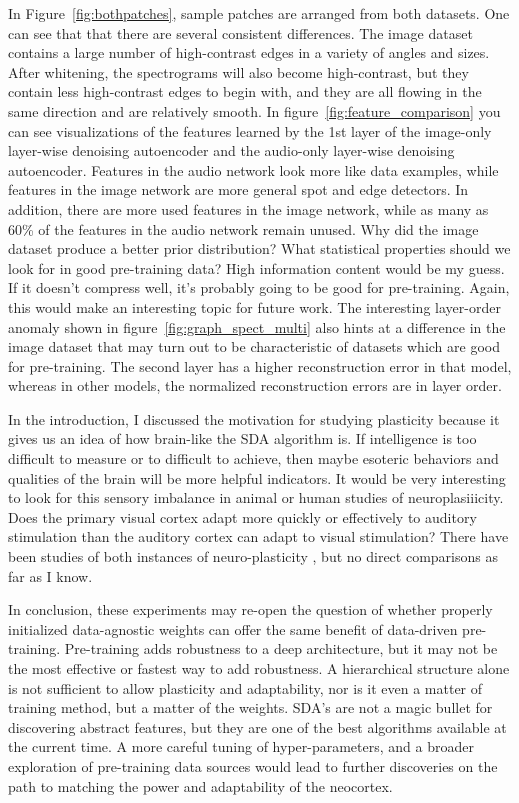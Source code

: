 \documentclass[12pt]{article}
\begin{document}
\begin{doublespacing}
	In Figure~\ref{fig:bothpatches}, sample patches are arranged from both datasets. One can see that that there are several consistent differences. The image dataset contains a large number of high-contrast edges in a variety of angles and sizes. After whitening, the spectrograms will also become high-contrast, but they contain less high-contrast edges to begin with, and they are all flowing in the same direction and are relatively smooth. In figure~\ref{fig:feature_comparison} you can see visualizations of the features learned by the 1st layer of the image-only layer-wise denoising autoencoder and the audio-only layer-wise denoising autoencoder. Features in the audio network look more like data examples, while features in the image network are more general spot and edge detectors. In addition, there are more used features in the image network, while as many as 60\% of the features in the audio network remain unused. Why did the image dataset produce a better prior distribution? What statistical properties should we look for in good pre-training data? High information content would be my guess. If it doesn't compress well, it's probably going to be good for pre-training. Again, this would make an interesting topic for future work. The interesting layer-order anomaly shown in figure~\ref{fig:graph_spect_multi} also hints at a difference in the image dataset that may turn out to be characteristic of datasets which are good for pre-training. The second layer has a higher reconstruction error in that model, whereas in other models, the normalized reconstruction errors are in layer order.
	
	In the introduction, I discussed the motivation for studying plasticity because it gives us an idea of how brain-like the SDA algorithm is. If intelligence is too difficult to measure or to difficult to achieve, then maybe esoteric behaviors and qualities of the brain will be more helpful indicators. It would be very interesting to look for this sensory imbalance in animal or human studies of neuroplasiiicity. Does the primary visual cortex adapt more quickly or effectively to auditory stimulation than the auditory cortex can adapt to visual stimulation? There have been studies of both instances of neuro-plasticity \cite{ryugo1975increased, gyllensten1966growth}, but no direct comparisons as far as I know. 
	
	In conclusion, these experiments may re-open the question of whether properly initialized data-agnostic weights can offer the same benefit of data-driven pre-training. Pre-training adds robustness to a deep architecture, but it may not be the most effective or fastest way to add robustness. A hierarchical structure alone is not sufficient to allow plasticity and adaptability, nor is it even a matter of training method, but a matter of the weights. SDA's are not a magic bullet for discovering abstract features, but they are one of the best algorithms available at the current time. A more careful tuning of hyper-parameters, and a broader exploration of pre-training data sources would lead to further discoveries on the path to matching the power and adaptability of the neocortex.

\end{doublespacing}

\singlespacing




\end{document}
